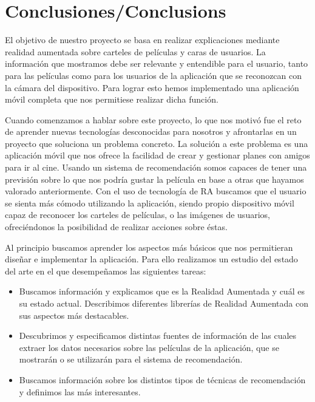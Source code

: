 
\cleardoublepage


\chapter{Conclusiones/Conclusions}
\label{makereference5}

El objetivo de nuestro proyecto se basa en realizar explicaciones mediante realidad aumentada sobre 
carteles de películas y caras de usuarios. La información que mostramos debe ser relevante y entendible para el 
usuario, tanto para las películas como para los usuarios de la aplicación que se reconozcan con la cámara del dispositivo. 
Para lograr esto hemos implementado una aplicación móvil completa que nos permitiese realizar dicha función.

Cuando comenzamos a hablar sobre este proyecto, lo que nos motivó fue el
 reto de aprender nuevas tecnologías desconocidas para nosotros y afrontarlas
 en un proyecto que soluciona un problema concreto. La solución a este problema
 es una aplicación móvil que nos ofrece la facilidad de crear y gestionar
 planes con amigos para ir al cine. Usando un sistema de recomendación somos
 capaces de tener una previsión sobre lo que nos podría gustar la película en
 base a otras que hayamos valorado anteriormente.
 Con el uso de tecnología de RA buscamos que el usuario se sienta más cómodo
 utilizando la aplicación, siendo 
 propio dispositivo móvil capaz de reconocer los carteles de películas, o las
 imágenes de usuarios, ofreciéndonos la posibilidad de realizar acciones sobre éstas.

Al principio buscamos aprender los aspectos más básicos que nos permitieran
 diseñar e implementar la aplicación. Para ello realizamos un estudio
 del estado del arte en el que desempeñamos las siguientes tareas:
\begin{itemize}  
    \item Buscamos información y explicamos que es la Realidad Aumentada y cuál
     es su estado actual. Describimos diferentes librerías de Realidad Aumentada
     con sus aspectos más destacables.
    \item Descubrimos y especificamos distintas fuentes de información de las
     cuales extraer los datos necesarios sobre las películas de la aplicación,
     que se mostrarán o se utilizarán para el sistema de recomendación.
    \item Buscamos información sobre los distintos tipos de técnicas de
     recomendación y definimos las más interesantes.
\end{itemize}


